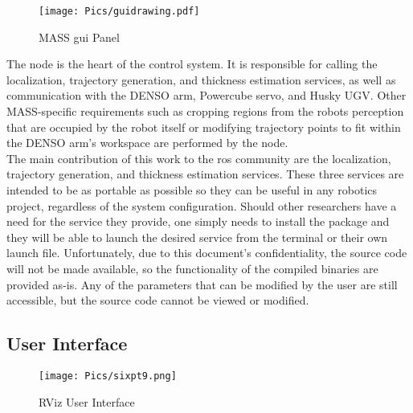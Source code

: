 \begin{figure}[ht!]
    \centering
    \texttt{[image: Pics/guidrawing.pdf]}
    \caption{MASS \acrshort{gui} Panel}
    \label{fig:thegui}
\end{figure}

The  node is the heart of the control system. It is responsible for calling the localization, trajectory generation, and thickness estimation services, as well as communication with the DENSO arm, Powercube servo, and Husky UGV. Other MASS-specific requirements such as cropping regions from the robots perception that are occupied by the robot itself or  modifying trajectory points to fit within the DENSO arm's workspace are performed by the  node. \\

The main contribution of this work to the \acrshort{ros} community are the localization, trajectory generation, and thickness estimation services. These three services are intended to be as portable as possible so they can be useful in any robotics project, regardless of the system configuration. Should other researchers have a need for the service they provide, one simply needs to install the package and they will be able to launch the desired service from the terminal or their own launch file. Unfortunately, due to this document's confidentiality, the source code will not be made available, so the functionality of the compiled binaries are provided as-is. Any of the parameters that can be modified by the user are still accessible, but the source code cannot be viewed or modified.\\
\subsection{User Interface}
\label{sub:gui}
\begin{figure}[H]
    \centering
    \texttt{[image: Pics/sixpt9.png]}
    \caption{RViz User Interface}
    \label{fig:panel}
\end{figure}

